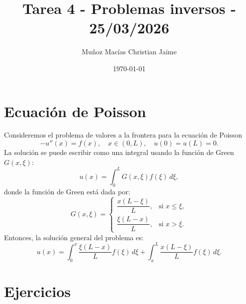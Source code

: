 \documentclass[12pt,spanish,mexico]{article}
\title{Tarea 4 - Problemas inversos - 25/03/2026}
\author{Muñoz Macías Christian Jaime}
\date{\today}
\numberwithin{equation}{section}
\theoremstyle{definition}
\theoremstyle{remark}
\begin{document}
\maketitle

\section*{Ecuación de Poisson}
Consideremos el problema de valores a la frontera para la ecuación de Poisson
\[
-u''(x) = f(x), \quad x \in (0, L), \quad u(0) = u(L) = 0. \tag{1}
\]
La solución se puede escribir como una integral usando la función de Green $G(x, \xi)$:
\[
u(x) = \int_{0}^{L} G(x, \xi) f(\xi) \, d\xi,
\]
donde la función de Green está dada por:
\[
G(x, \xi) = \begin{cases} 
\dfrac{x(L - \xi)}{L}, & \text{si } x \le \xi, \\[10pt]
\dfrac{\xi(L - x)}{L}, & \text{si } x > \xi. 
\end{cases}
\]
Entonces, la solución general del problema es:
\[
u(x) = \int_{0}^{x} \frac{\xi(L-x)}{L} f(\xi) \, d\xi + \int_{x}^{L} \frac{x(L-\xi)}{L} f(\xi) \, d\xi. \tag{2}
\]

\section*{Ejercicios}
\end{document}
